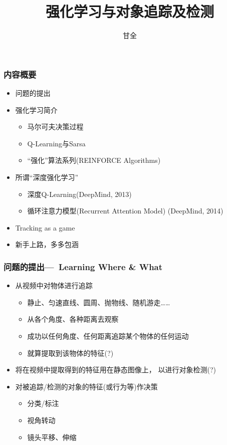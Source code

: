 \documentclass[10pt,CJK]{beamer}
\author{甘全}
\title{强化学习与对象追踪及检测}
\begin{document}
	\maketitle
	
	\begin{frame}
		\frametitle{内容概要}
		\begin{itemize}
			\item 问题的提出
			\item 强化学习简介
			\begin{itemize}
				\item 马尔可夫决策过程
				\item Q-Learning与Sarsa
				\item “强化”算法系列(REINFORCE Algorithms)
			\end{itemize}
			\item 所谓“深度强化学习”
			\begin{itemize}
				\item 深度Q-Learning(DeepMind, 2013)
				\item 循环注意力模型(Recurrent Attention Model)
				(DeepMind, 2014)
			\end{itemize}
			\item Tracking as a game
			\item 新手上路，多多包涵
		\end{itemize}
	\end{frame}
	
	\begin{frame}
		\frametitle{问题的提出---~Learning Where \& What
			\only<8->{+ What to Do}}
		\pause
		\begin{itemize}
			\item 从视频中对物体进行追踪\pause
			\begin{itemize}
				\item 静止、匀速直线、圆周、抛物线、随机游走……\pause
				\item 从各个角度、各种距离去观察\pause
				\item 成功以任何角度、任何距离追踪某个物体的任何运动\pause
				\item 就算提取到该物体的特征(?)\pause
			\end{itemize}
			\item 将在视频中提取得到的特征用在静态图像上，
			以进行对象检测(?)\pause
			\item 对被追踪/检测的对象的特征(或行为等)作决策\pause
			\begin{itemize}
				\item 分类/标注\pause
				\item 视角转动\pause
				\item 镜头平移、伸缩
			\end{itemize}
		\end{itemize}
	\end{frame}
	
\end{document}
